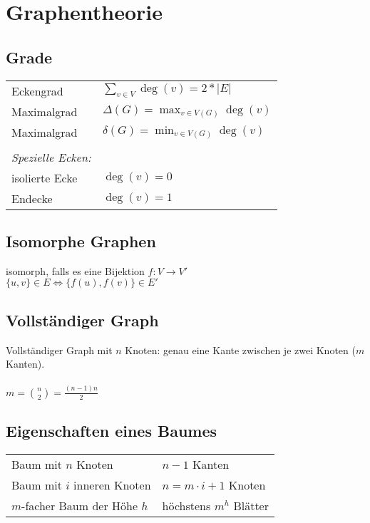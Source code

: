 \section{Graphentheorie}

\subsection{Grade}
\begin{tabular}{@{}ll}
    Eckengrad & $ \sum_{v \in V} \deg(v) = 2 * |E| $ \\
    Maximalgrad & $ \Delta(G) = \max_{v \in V(G)} {\deg}(v) $ \\
    Maximalgrad & $ \delta(G) = \min_{v \in V(G)} {\deg}(v) $ \\
    & \\
    \textit{Spezielle Ecken:} & \\
    isolierte Ecke & $ \deg(v) = 0 $ \\
    Endecke & $ \deg(v) = 1 $ \\
\end{tabular}

\subsection{Isomorphe Graphen}
isomorph, falls es eine Bijektion $ f : V \rightarrow V'$ \\
$ \{ u, v \} \in E \Leftrightarrow \{f(u), f(v)\} \in E' $

\subsection{Vollständiger Graph}
Vollständiger Graph mit $n$ Knoten: genau eine Kante zwischen je zwei Knoten ($m$ Kanten). \\
\\
$ m = \binom{n}{2} = \frac{(n-1)n}{2} $ 

\subsection{Eigenschaften eines Baumes}
\begin{tabular}{@{}ll}
    Baum mit $n$ Knoten & $n-1$ Kanten \\
    Baum mit $i$ inneren Knoten & $n=m \cdot i + 1$ Knoten \\
    $m$-facher Baum der Höhe $h$ & höchstens $m^h$ Blätter \\
\end{tabular}

